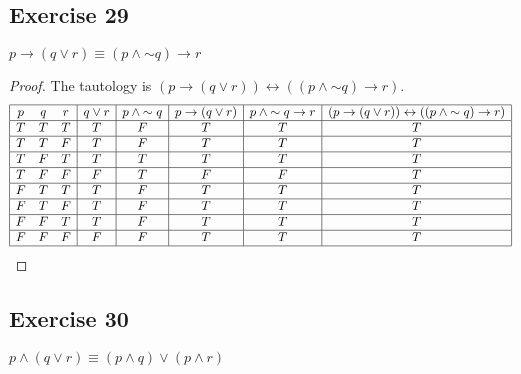 \documentclass[14pt]{extarticle}
\newcommand{\bic}{\leftrightarrow}
\begin{document}
\subsection{Exercise 29}
$p \to (q \vee r) \equiv (p \wedge {\sim q}) \to r$
\begin{proof} The tautology is $(p \to (q \vee r)) \bic ((p \wedge {\sim q}) \to
        r)$. $$ \begin{array}{|ccc|c|c|c|c|c|c|} \hline p & q                & r                       & q \vee r                & p \wedge
             {\sim q}                     & p \to (q \vee r) & p \wedge {\sim q} \to r & (p \to (q \vee r)) \bic
             ((p \wedge {\sim q}) \to r)                                                                                                \\ \hline T & T & T & T & F & T & T & T \\ \hline T
                                          & T                & F                       & T                       & F        & T & T & T \\ \hline T & F & T & T & T & T & T & T \\ \hline T
                                          & F                & F                       & F                       & T        & F & F & T \\ \hline F & T & T & T & F & T & T & T \\ \hline F
                                          & T                & F                       & T                       & F        & T & T & T \\ \hline F & F & T & T & F & T & T & T \\ \hline F
                                          & F                & F                       & F                       & F        & T & T & T \\ \hline\end{array} $$ \end{proof}

\subsection{Exercise 30}
$p \wedge (q \vee r) \equiv (p \wedge q) \vee (p \wedge r)$
\end{document}
